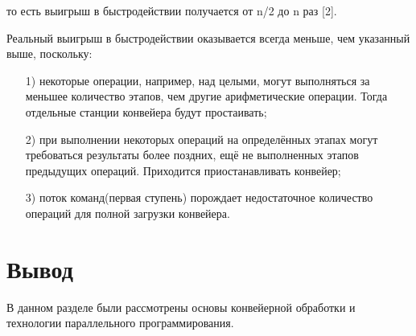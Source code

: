 то есть выигрыш в быстродействии получается от n/2  до n раз [2].


Реальный выигрыш в быстродействии оказывается всегда меньше, чем указанный выше, поскольку:

\begin{enumerate}
\item[1)] некоторые операции, например, над целыми, могут выполняться за меньшее количество этапов, чем другие арифметические операции. Тогда отдельные станции конвейера будут простаивать;
\item[2)] при выполнении некоторых операций на определённых этапах могут требоваться результаты более поздних, ещё не выполненных этапов предыдущих операций. Приходится приостанавливать конвейер;
\item[3)] поток команд(первая ступень) порождает недостаточное количество операций для полной загрузки конвейера.
\end{enumerate}
        
    \section{Вывод}
        В данном разделе были рассмотрены основы конвейерной обработки и технологии параллельного программирования.

\newpage